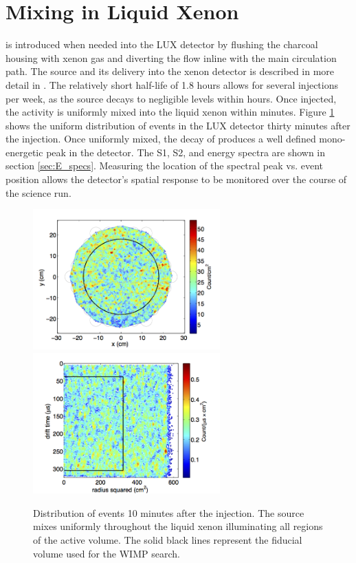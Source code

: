 \newpage

\section{\KrCal Mixing in Liquid Xenon}

\KrCal is introduced when needed into the LUX detector by flushing the charcoal housing with xenon gas and diverting the flow inline with the main circulation path. The \KrCal source and its delivery into the xenon detector is described in more detail in \cite{Kastens}. The relatively short half-life of 1.8 hours allows for several injections per week, as the source decays to negligible levels within hours. Once injected, the activity is uniformly mixed into the liquid xenon within minutes. Figure \ref{fig:Kr_Dist} shows the uniform distribution of \KrCal events in the LUX detector thirty minutes after the injection. Once uniformly mixed, the decay of \KrCal produces a well defined mono-energetic peak in the detector. The S1, S2, and energy spectra are shown in section \ref{sec:E_specs}. Measuring the location of the spectral peak vs. event position allows the detector's spatial response to be monitored over the course of the science run.

\newpage

\begin{figure}[h!]\centering
\includegraphics[width=72mm]{Chapter_XYZ_Corr/Thesis_Corr_Plots/Kr_XY_density.png}
\includegraphics[width=72mm]{Chapter_XYZ_Corr/Thesis_Corr_Plots/Kr_RZ_density.png}
\caption{Distribution of \KrCal events 10 minutes after the injection. The source mixes uniformly throughout the liquid xenon illuminating all regions of the active volume. The solid black lines represent the fiducial volume used for the WIMP search. }
\label{fig:Kr_Dist}
\end{figure}

